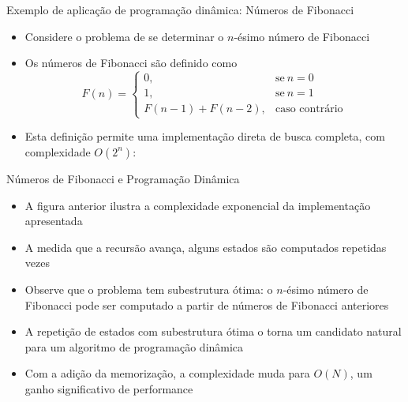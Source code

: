 \begin{frame}[fragile]{Exemplo de aplicação de programação dinâmica: Números de Fibonacci}


    \begin{itemize}
        \item Considere o problema de se determinar o $n$-ésimo número de Fibonacci
        \pause

        \item Os números de Fibonacci são definido como
        \[
            F(n) = \left\{ \begin{array}{ll}
                    0,& \mbox{se}\ n = 0 \\
                    1,& \mbox{se}\ n = 1 \\
                    F(n - 1) + F(n - 2),& \mbox{caso contrário}
                \end{array}\right.
        \]
        \pause

        \item Esta definição permite uma implementação direta de busca completa, com complexidade
            $O(2^n)$:


    \end{itemize}

\end{frame}



\begin{frame}[fragile]{Números de Fibonacci e Programação Dinâmica}

    \begin{itemize}
        \item A figura anterior ilustra a complexidade exponencial da implementação
            apresentada
        \pause

        \item A medida que a recursão avança, alguns estados são computados repetidas vezes
        \pause

        \item Observe que o problema tem subestrutura ótima: o $n$-ésimo número de Fibonacci pode
            ser computado a partir de números de Fibonacci anteriores
        \pause

        \item A repetição de estados com subestrutura ótima o torna um candidato natural para um
            algoritmo de programação dinâmica
        \pause

        \item Com a adição da memorização, a complexidade muda para $O(N)$, um ganho significativo
            de performance
    \end{itemize}

\end{frame}

